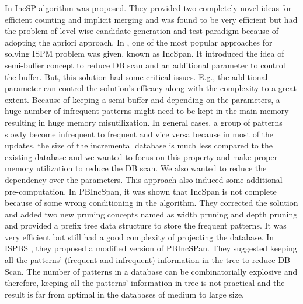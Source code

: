 In \cite{lin2004incremental} IncSP algorithm was proposed. They provided two completely novel ideas for efficient counting and implicit merging and was found to be very efficient but had the problem of level-wise candidate generation and test paradigm because of adopting the apriori approach. In \cite{cheng2004incspan}, one of the most popular approaches for solving ISPM problem was given, known as IncSpan. It introduced the idea of semi-buffer concept to reduce DB scan and an additional parameter to control the buffer. But, this solution had some critical issues. E.g., the additional parameter can control the solution's efficacy along with the complexity to a great extent. Because of keeping a semi-buffer and depending on the parameters, a huge number of infrequent patterns might need to be kept in the main memory resulting in huge memory misutilization. In general cases, a group of patterns slowly become infrequent to frequent and vice versa because in most of the updates, the size of the incremental database is much less compared to the existing database and we wanted to focus on this property and make proper memory utilization to reduce the DB scan. We also wanted to reduce the dependency over the parameters. This approach also induced some additional pre-computation. In PBIncSpan\cite{chen2007incremental}, it was shown that IncSpan is not complete because of some wrong conditioning in the algorithm. They corrected the solution and added two new pruning concepts named as width pruning and depth pruning and provided a prefix tree data structure to store the frequent patterns. It was very efficient but still had a good complexity of projecting the database. In ISPBS \cite{liu2012incremental}, they proposed a modified version of PBIncSPan. They suggested keeping all the patterns' (frequent and infrequent) information in the tree to reduce DB Scan. The number of patterns in a database can be combinatorially explosive and therefore, keeping all the patterns' information in tree is not practical and the result is far from optimal in the databases of medium to large size.

